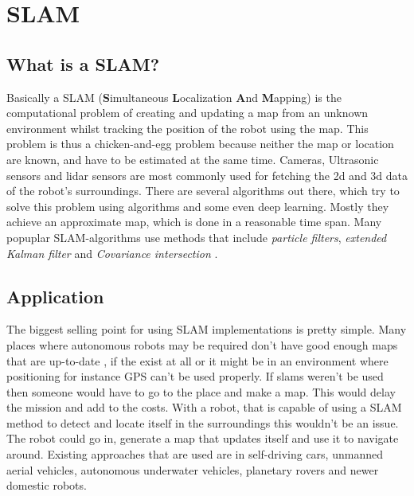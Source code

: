 
\chapter{SLAM\authorA}

\section{What is a SLAM?}
Basically a SLAM (\textbf{S}imultaneous \textbf{L}ocalization \textbf{A}nd \textbf{M}apping) is the computational problem of creating and updating a map from an unknown environment whilst tracking the position of the robot using the map. This problem is thus a chicken-and-egg problem because neither the map or location are known, and have to be estimated at the same time. Cameras, Ultrasonic sensors and lidar sensors are most commonly used for fetching the 2d and 3d data of the robot's surroundings. \newline
There are several algorithms out there, which try to solve this problem using algorithms and some even deep learning. Mostly they achieve an approximate map, which is done in a reasonable time span. Many popuplar SLAM-algorithms use methods that include \textit{particle filters}, \textit{extended Kalman filter} and \textit{Covariance intersection} \cite{1678144} \cite{slamfordummies}. \newline

\section{Application}
The biggest selling point for using SLAM implementations is pretty simple. Many places where autonomous robots may be required don't have good enough maps that are up-to-date , if the exist at all or it might be in an environment where positioning for instance GPS can't be used properly. If slams weren't be used then someone would have to go to the place and make a map. This would delay the mission and add to the costs. \newline
With a robot, that is capable of using a SLAM method to detect and locate itself in the surroundings this wouldn't be an issue. The robot could go in, generate a map that updates itself and use it to navigate around. \newline
Existing approaches that are used are in self-driving cars, unmanned aerial vehicles, autonomous underwater vehicles, planetary rovers and newer domestic robots.

